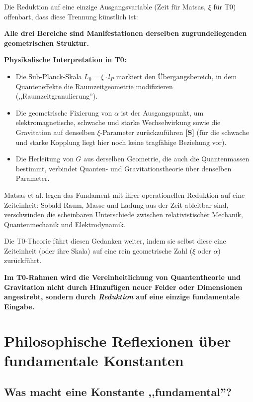 	Die Reduktion auf eine einzige Ausgangsvariable (Zeit für Matsas, $\xi$ für T0) offenbart, dass diese Trennung künstlich ist:
	
	\begin{insight}
		\textbf{Alle drei Bereiche sind Manifestationen derselben zugrundeliegenden geometrischen Struktur.}
	\end{insight}
	
	\textbf{Physikalische Interpretation in T0:}
	
	\begin{itemize}
		\item Die Sub-Planck-Skala $L_0 = \xi \cdot l_P$ markiert den Übergangsbereich, in dem Quanteneffekte die Raumzeitgeometrie modifizieren (,,Raumzeitgranulierung'').
		
		\item Die geometrische Fixierung von $\alpha$ ist der Ausgangspunkt, um elektromagnetische, schwache und starke Wechselwirkung sowie die Gravitation auf denselben $\xi$-Parameter zurückzuführen \textbf{[S]} (für die schwache und starke Kopplung liegt hier noch keine tragfähige Beziehung vor).
		
		\item Die Herleitung von $G$ aus derselben Geometrie, die auch die Quantenmassen bestimmt, verbindet Quanten- und Gravitationstheorie über denselben Parameter.
	\end{itemize}
	
	Matsas et al. legen das Fundament mit ihrer operationellen Reduktion auf eine Zeiteinheit: Sobald Raum, Masse und Ladung aus der Zeit ableitbar sind, verschwinden die scheinbaren Unterschiede zwischen relativistischer Mechanik, Quantenmechanik und Elektrodynamik.
	
	Die T0-Theorie führt diesen Gedanken weiter, indem sie selbst diese eine Zeiteinheit (oder ihre Skala) auf eine rein geometrische Zahl ($\xi$ oder $\alpha$) zurückführt.
	
	\textbf{Im T0-Rahmen wird die Vereinheitlichung von Quantentheorie und Gravitation nicht durch Hinzufügen neuer Felder oder Dimensionen angestrebt, sondern durch \emph{Reduktion} auf eine einzige fundamentale Eingabe.}
	
	\section{Philosophische Reflexionen über fundamentale Konstanten}
	
	\subsection{Was macht eine Konstante ,,fundamental''?}
	
